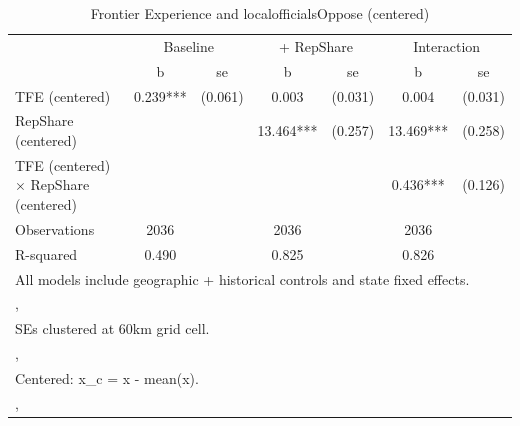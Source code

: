 \begin{table}[htbp]\centering
\def\sym#1{\ifmmode^{#1}\else\(^{#1}\)\fi}
\caption{Frontier Experience and localofficialsOppose (centered)}
\begin{tabular}{l*{3}{cc}}
\toprule
                &\multicolumn{2}{c}{Baseline}&\multicolumn{2}{c}{ + RepShare}&\multicolumn{2}{c}{Interaction}\\
                &        b   &       se&        b   &       se&        b   &       se\\
\midrule
TFE (centered)  &    0.239***&  (0.061)&    0.003   &  (0.031)&    0.004   &  (0.031)\\
RepShare (centered)&            &         &   13.464***&  (0.257)&   13.469***&  (0.258)\\
TFE (centered) $\times$ RepShare (centered)&            &         &            &         &    0.436***&  (0.126)\\
\midrule
Observations    &     2036   &         &     2036   &         &     2036   &         \\
R-squared       &    0.490   &         &    0.825   &         &    0.826   &         \\
\bottomrule
\multicolumn{7}{l}{\footnotesize All models include geographic + historical controls and state fixed effects.}\\
\multicolumn{7}{l}{\footnotesize ,}\\
\multicolumn{7}{l}{\footnotesize SEs clustered at 60km grid cell.}\\
\multicolumn{7}{l}{\footnotesize ,}\\
\multicolumn{7}{l}{\footnotesize Centered: x\_c = x - mean(x).}\\
\multicolumn{7}{l}{\footnotesize ,}\\
\end{tabular}
\end{table}
